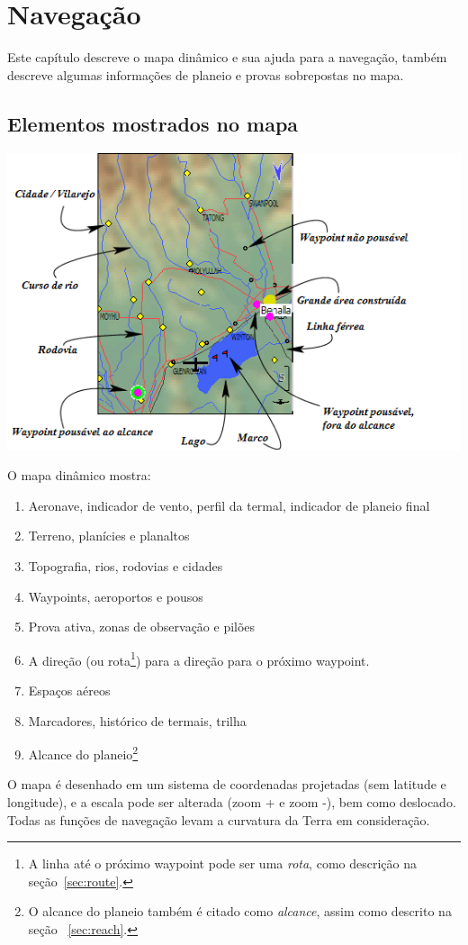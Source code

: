 \chapter{Navegação}\label{cha:navigation}
Este capítulo descreve o mapa dinâmico e sua ajuda para a navegação, também descreve algumas informações de planeio e provas sobrepostas no mapa.

\section{Elementos mostrados no mapa}

\begin{maxipage}
\includegraphics[angle=0,width=0.9\linewidth,keepaspectratio='true']{figures/fig-map.png}
\end{maxipage}

O mapa dinâmico mostra: 
\begin{enumerate} 
\item Aeronave, indicador de vento, perfil da termal, indicador de planeio final
\item Terreno, planícies e planaltos
\item Topografia, rios, rodovias e cidades
\item Waypoints, aeroportos e pousos
\item Prova ativa, zonas de observação e pilões
\item A direção (ou rota\footnote {A linha até o próximo waypoint pode ser uma {\em rota}, como descrição na seção~\ref{sec:route}.}) para a direção para o próximo waypoint.
\item Espaços aéreos
\item Marcadores, histórico de termais, trilha
\item Alcance do planeio\footnote{O alcance do planeio também é citado como
  {\em alcance}, assim como descrito na seção ~\ref{sec:reach}.}
\end{enumerate}
O mapa é desenhado em um sistema de coordenadas projetadas (sem latitude e longitude), e a escala pode ser alterada (zoom + e zoom -), bem como deslocado.  Todas as funções de navegação levam a curvatura da Terra em consideração.


